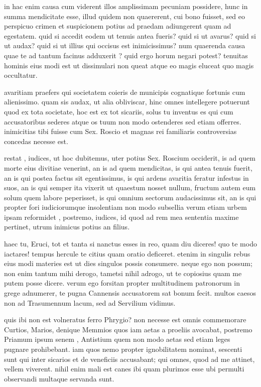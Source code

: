  in hac enim causa cum viderent illos amplissimam pecuniam possidere, hunc in summa mendicitate esse, illud quidem non quaererent, cui bono fuisset, sed eo perspicuo crimen et suspicionem potius ad praedam adiungerent quam ad egestatem. quid si accedit eodem ut tenuis antea fueris? quid si ut avarus? quid si ut audax? quid si ut illius qui occisus est inimicissimus? num quaerenda causa quae te ad tantum facinus adduxerit ? quid ergo horum negari potest? tenuitas hominis eius modi est ut dissimulari non queat atque eo magis eluceat quo magis occultatur.

 avaritiam praefers qui societatem coieris de municipis cognatique fortunis cum alienissimo. quam sis audax, ut alia obliviscar, hinc omnes intellegere potuerunt quod ex tota societate, hoc est ex tot sicariis, solus tu inventus es qui cum accusatoribus sederes atque os tuum non modo ostenderes sed etiam offerres. inimicitias tibi fuisse cum Sex. Roscio et magnas rei familiaris controversias concedas necesse est.

 restat , iudices, ut hoc dubitemus, uter potius Sex. Roscium occiderit, is ad quem morte eius divitiae venerint, an is ad quem mendicitas, is qui antea tenuis fuerit, an is qui postea factus sit egentissimus, is qui ardens avaritia feratur infestus in suos, an is qui semper ita vixerit ut quaestum nosset nullum, fructum autem eum solum quem labore peperisset, is qui omnium sectorum audacissimus sit, an is qui propter fori iudiciorumque insolentiam non modo subsellia verum etiam urbem ipsam reformidet , postremo, iudices, id quod ad rem mea sententia maxime pertinet, utrum inimicus potius an filius.

 haec tu, Eruci, tot et tanta si nanctus esses in reo, quam diu diceres! quo te modo iactares! tempus hercule te citius quam oratio deficeret. etenim in singulis rebus eius modi materies est ut dies singulos possis consumere. neque ego non possum; non enim tantum mihi derogo, tametsi nihil adrogo, ut te copiosius quam me putem posse dicere. verum ego forsitan propter multitudinem patronorum in grege adnumerer, te pugna Cannensis accusatorem sat bonum fecit. multos caesos non ad Trasumennum lacum, sed ad Servilium vidimus.

 quis ibi non est volneratus ferro Phrygio? non necesse est omnis commemorare Curtios, Marios, denique Memmios quos iam aetas a proeliis avocabat, postremo Priamum ipsum senem , Antistium quem non modo aetas sed etiam leges pugnare prohibebant. iam quos nemo propter ignobilitatem nominat, sescenti sunt qui inter sicarios et de veneficiis accusabant; qui omnes, quod ad me attinet, vellem viverent. nihil enim mali est canes ibi quam plurimos esse ubi permulti observandi multaque servanda sunt.

